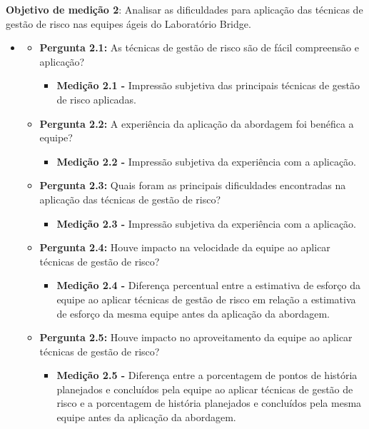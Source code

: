 \documentclass[
    12pt,       %
    openright,      %
    twoside,      %
    a4paper,      %
    english,      %
    french,       %
    spanish,      %
    brazil,       %
    ]{abntex2}
\begin{document}
\textbf{Objetivo de medição 2}: Analisar as dificuldades para aplicação das técnicas de gestão de risco nas equipes ágeis do Laboratório Bridge.

\begin{itemize}[label={}]
\item
\begin{itemize}
        \item \textbf{Pergunta 2.1:} As técnicas de gestão de risco são de fácil compreensão e aplicação?
            \begin{itemize}[label={}]
                \item \textbf{Medição 2.1 - } Impressão subjetiva das principais técnicas de gestão de risco aplicadas.
            \end{itemize}
        \item \textbf{Pergunta 2.2:} A experiência da aplicação da abordagem foi benéfica a equipe?
            \begin{itemize}[label={}]
                \item \textbf{Medição 2.2 - } Impressão subjetiva da experiência com a aplicação.
            \end{itemize}        
        \item \textbf{Pergunta 2.3:} Quais foram as principais dificuldades encontradas na aplicação das técnicas de gestão de risco?
            \begin{itemize}[label={}]
                \item \textbf{Medição 2.3 - } Impressão subjetiva da experiência com a aplicação.
            \end{itemize}    
        \item \textbf{Pergunta 2.4:} Houve impacto na velocidade da equipe ao aplicar técnicas de gestão de risco?
            \begin{itemize}[label={}]
                \item \textbf{Medição 2.4 -} 
                Diferença percentual entre a estimativa de esforço da equipe ao aplicar técnicas de gestão de risco em relação a estimativa de esforço da mesma equipe antes da aplicação da abordagem.
            \end{itemize}    
        \item \textbf{Pergunta 2.5:} Houve impacto no aproveitamento da equipe ao aplicar técnicas de gestão de risco?
            \begin{itemize}[label={}]
                \item \textbf{Medição 2.5 -} 
                Diferença entre a porcentagem de pontos de história planejados e concluídos pela equipe ao aplicar técnicas de gestão de risco e a porcentagem de história planejados e concluídos pela mesma equipe antes da aplicação da abordagem.
            \end{itemize}        

\end{itemize}
\end{itemize}
\end{document}
